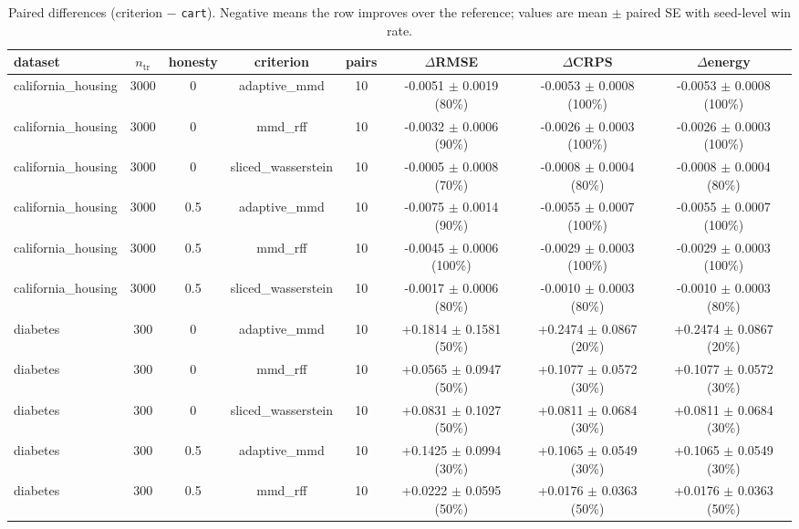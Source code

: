\begin{table}[h]
  \centering
  \caption{Paired differences (criterion $-$ \texttt{cart}). Negative means the row improves over the reference; values are mean $\pm$ paired SE with seed-level win rate.}
  \label{tab:real}
  \begin{adjustbox}{max width=\textwidth}
  \begin{tabular}{lccccccc}
    \toprule
    dataset & $n_{\mathrm{tr}}$ & honesty & criterion & pairs & $\Delta$RMSE & $\Delta$CRPS & $\Delta$energy \\
    \midrule
    california\_housing & 3000 & 0 & adaptive\_mmd & 10 & -0.0051 $\pm$ 0.0019 (80\%) & -0.0053 $\pm$ 0.0008 (100\%) & -0.0053 $\pm$ 0.0008 (100\%) \\
    california\_housing & 3000 & 0 & mmd\_rff & 10 & -0.0032 $\pm$ 0.0006 (90\%) & -0.0026 $\pm$ 0.0003 (100\%) & -0.0026 $\pm$ 0.0003 (100\%) \\
    california\_housing & 3000 & 0 & sliced\_wasserstein & 10 & -0.0005 $\pm$ 0.0008 (70\%) & -0.0008 $\pm$ 0.0004 (80\%) & -0.0008 $\pm$ 0.0004 (80\%) \\
    california\_housing & 3000 & 0.5 & adaptive\_mmd & 10 & -0.0075 $\pm$ 0.0014 (90\%) & -0.0055 $\pm$ 0.0007 (100\%) & -0.0055 $\pm$ 0.0007 (100\%) \\
    california\_housing & 3000 & 0.5 & mmd\_rff & 10 & -0.0045 $\pm$ 0.0006 (100\%) & -0.0029 $\pm$ 0.0003 (100\%) & -0.0029 $\pm$ 0.0003 (100\%) \\
    california\_housing & 3000 & 0.5 & sliced\_wasserstein & 10 & -0.0017 $\pm$ 0.0006 (80\%) & -0.0010 $\pm$ 0.0003 (80\%) & -0.0010 $\pm$ 0.0003 (80\%) \\
    diabetes & 300 & 0 & adaptive\_mmd & 10 & +0.1814 $\pm$ 0.1581 (50\%) & +0.2474 $\pm$ 0.0867 (20\%) & +0.2474 $\pm$ 0.0867 (20\%) \\
    diabetes & 300 & 0 & mmd\_rff & 10 & +0.0565 $\pm$ 0.0947 (50\%) & +0.1077 $\pm$ 0.0572 (30\%) & +0.1077 $\pm$ 0.0572 (30\%) \\
    diabetes & 300 & 0 & sliced\_wasserstein & 10 & +0.0831 $\pm$ 0.1027 (50\%) & +0.0811 $\pm$ 0.0684 (30\%) & +0.0811 $\pm$ 0.0684 (30\%) \\
    diabetes & 300 & 0.5 & adaptive\_mmd & 10 & +0.1425 $\pm$ 0.0994 (30\%) & +0.1065 $\pm$ 0.0549 (30\%) & +0.1065 $\pm$ 0.0549 (30\%) \\
    diabetes & 300 & 0.5 & mmd\_rff & 10 & +0.0222 $\pm$ 0.0595 (50\%) & +0.0176 $\pm$ 0.0363 (50\%) & +0.0176 $\pm$ 0.0363 (50\%) \\

\end{tabular}
\end{adjustbox}
\end{table}
